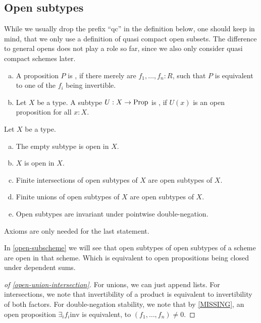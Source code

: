 \subsection{Open subtypes}

While we usually drop the prefix ``qc'' in the definition below,
one should keep in mind, that we only use a definition of quasi compact open subsets.
The difference to general opens does not play a role so far,
since we also only consider quasi compact schemes later.

\begin{definition}%
  \label{qc-open}
  \begin{enumerate}[(a)]
  \item A proposition $P$ is , if there merely are $f_1,\dots,f_n:R$,
    such that $P$ is equivalent to one of the $f_i$ being invertible.
  \item Let $X$ be a type.
    A subtype $U:X\to\mathrm{Prop}$ is , if $U(x)$ is an open proposition for all $x:X$.
  \end{enumerate}
\end{definition}

\begin{proposition}%
  \label{open-union-intersection}
  Let $X$ be a type.
  \begin{enumerate}[(a)]
  \item The empty subtype is open in $X$.
  \item $X$ is open in $X$.
  \item Finite intersections of open subtypes of $X$ are open subtypes of $X$.
  \item Finite unions of open subtypes of $X$ are open subtypes of $X$.
  \item Open subtypes are invariant under pointwise double-negation.
  \end{enumerate}
  Axioms are only needed for the last statement.
\end{proposition}

In \cref{open-subscheme} we will see that open subtypes of open subtypes of a scheme are open in that scheme.
Which is equivalent to open propositions being closed under dependent sums.

\begin{proof}[of \cref{open-union-intersection}]
  For unions, we can just append lists.
  For intersections, we note that invertibility of a product
  is equivalent to invertibility of both factors.
  For double-negation stability,
  we note that by \cref{MISSING},
  an open proposition $\exists_i f_i \mathrm{inv}$ is equivalent,
  to $(f_1,\dots,f_n)\neq 0$.
\end{proof}

